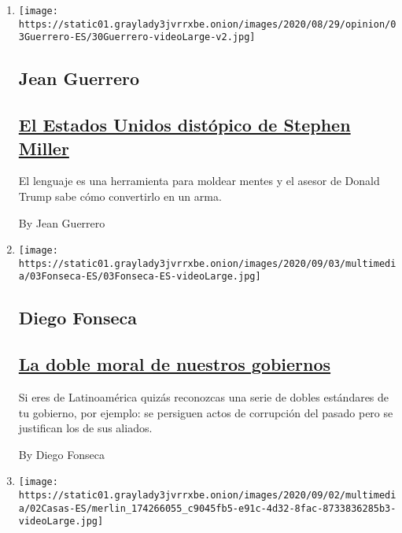 \begin{enumerate}
\def\labelenumi{\arabic{enumi}.}
\item
  \texttt{[image: https://static01.graylady3jvrrxbe.onion/images/2020/08/29/opinion/03Guerrero-ES/30Guerrero-videoLarge-v2.jpg]}

  \hypertarget{jean-guerrero}{%
  \subsection{Jean Guerrero}\label{jean-guerrero}}

  \hypertarget{el-estados-unidos-distuxf3pico-de-stephen-miller}{%
  \subsection{\texorpdfstring{\href{/es/2020/09/03/espanol/opinion/stephen-miller-trump.html}{El
  Estados Unidos distópico de Stephen
  Miller}}{El Estados Unidos distópico de Stephen Miller}}\label{el-estados-unidos-distuxf3pico-de-stephen-miller}}

  El lenguaje es una herramienta para moldear mentes y el asesor de
  Donald Trump sabe cómo convertirlo en un arma.

  By Jean Guerrero
\item
  \texttt{[image: https://static01.graylady3jvrrxbe.onion/images/2020/09/03/multimedia/03Fonseca-ES/03Fonseca-ES-videoLarge.jpg]}

  \hypertarget{diego-fonseca}{%
  \subsection{Diego Fonseca}\label{diego-fonseca}}

  \hypertarget{la-doble-moral-de-nuestros-gobiernos}{%
  \subsection{\texorpdfstring{\href{/es/2020/09/03/espanol/opinion/amlo-corrupcion.html}{La
  doble moral de nuestros
  gobiernos}}{La doble moral de nuestros gobiernos}}\label{la-doble-moral-de-nuestros-gobiernos}}

  Si eres de Latinoamérica quizás reconozcas una serie de dobles
  estándares de tu gobierno, por ejemplo: se persiguen actos de
  corrupción del pasado pero se justifican los de sus aliados.

  By Diego Fonseca
\item
  \texttt{[image: https://static01.graylady3jvrrxbe.onion/images/2020/09/02/multimedia/02Casas-ES/merlin\_174266055\_c9045fb5-e91c-4d32-8fac-8733836285b3-videoLarge.jpg]}


\end{enumerate}
